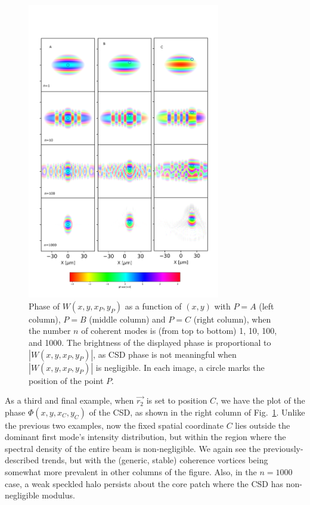 \documentclass[%
 reprint,
 amsmath,amssymb,
 aps,
]{revtex4-1}
\begin{document}
\begin{figure}
\includegraphics[width=0.75\textwidth]{Figures/vx_id16a_ABC.png}
\caption{Phase of $W(x,y,x_P,y_P)$ as a function of $(x,y)$ with $P=A$ (left column), $P=B$ (middle column) and $P=C$ (right column), when the number $n$ of coherent modes is (from top to bottom) 1, 10, 100, and 1000. The brightness of the displayed phase is proportional to $|W(x,y,x_P,y_P)|$, as CSD phase is not meaningful when $|W(x,y,x_P,y_P)|$ is negligible. In each image, a circle marks the position of the point $P$.}
\label{pointP}%
\end{figure}

As a third and final example, when $\vec{r_2}$ is set to position $C$, we have the plot of the phase $\Phi(x,y,x_C,y_C)$ of the CSD, as shown in the right column of Fig.~\ref{pointP}.  Unlike the previous two examples, now the fixed spatial coordinate $C$ lies outside the dominant first mode's intensity distribution, but within the region where the spectral density of the entire beam is non-negligible.  We again see the previously-described trends, but with the (generic, stable) coherence vortices being somewhat more prevalent in other columns of the figure.  Also, in the $n=1000$ case, a weak speckled halo persists about the core patch where the CSD has non-negligible modulus.    
\end{document}
